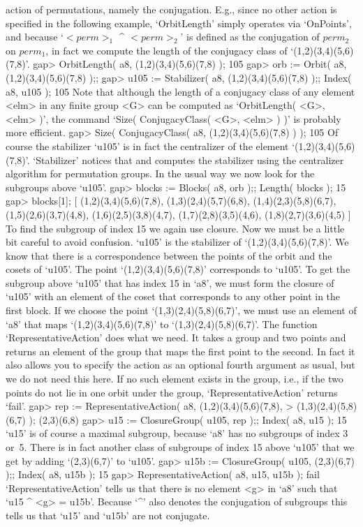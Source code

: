 action of permutations, namely the  conjugation.
E.g., since no  other action is specified  in the  following example,
`OrbitLength' simply operates via `OnPoints',
and because `$<perm>_1$ ^ $<perm>_2$' is defined as the conjugation
of $perm_2$ on $perm_1$, in fact we compute the length of
the conjugacy class of `(1,2)(3,4)(5,6)(7,8)'.
\beginexample
gap> OrbitLength( a8, (1,2)(3,4)(5,6)(7,8) );
105
gap> orb := Orbit( a8, (1,2)(3,4)(5,6)(7,8) );;
gap> u105 := Stabilizer( a8, (1,2)(3,4)(5,6)(7,8) );; Index( a8, u105 );
105
\endexample
Note that although the length of a conjugacy class of any element <elm>
in any finite group <G> can be computed as `OrbitLength( <G>, <elm> )',
the command `Size( ConjugacyClass( <G>, <elm> ) )' is probably more
efficient.
\beginexample
gap> Size( ConjugacyClass( a8, (1,2)(3,4)(5,6)(7,8) ) );
105
\endexample
Of course the stabilizer `u105' is in fact the centralizer of the element
`(1,2)(3,4)(5,6)(7,8)'.  `Stabilizer' notices    that and computes    the
stabilizer using the centralizer algorithm for permutation groups. In the
usual way we now look for the subgroups above `u105'.
\beginexample
gap> blocks := Blocks( a8, orb );; Length( blocks );
15
gap> blocks[1];
[ (1,2)(3,4)(5,6)(7,8), (1,3)(2,4)(5,7)(6,8), (1,4)(2,3)(5,8)(6,7), 
  (1,5)(2,6)(3,7)(4,8), (1,6)(2,5)(3,8)(4,7), (1,7)(2,8)(3,5)(4,6), 
  (1,8)(2,7)(3,6)(4,5) ]
\endexample
To find the subgroup of index 15 we  again use closure. Now  we must be a
little bit  careful to avoid    confusion. `u105' is the  stabilizer   of
`(1,2)(3,4)(5,6)(7,8)'. We  know  that there is  a correspondence between
the  points  of  the   orbit and  the   cosets  of  `u105'.   The   point
`(1,2)(3,4)(5,6)(7,8)' corresponds   to `u105'.
To get the subgroup above `u105' that has index 15 in `a8',
we must form the closure of `u105' with an element of the coset that
corresponds to any other point in the first block.
If we choose the point `(1,3)(2,4)(5,8)(6,7)',
we must use an element of `a8' that maps `(1,2)(3,4)(5,6)(7,8)' to
`(1,3)(2,4)(5,8)(6,7)'.
The function `RepresentativeAction' does what we need.
It takes a group and two points and returns an element of the group
that maps the first point to the second.
In fact it also allows you to specify the action as an optional fourth
argument as usual, but we do not need this here.
If no such element exists in the  group, i.e., if the two points do not
lie in one orbit under the group,
`RepresentativeAction' returns `fail'.
\beginexample
gap> rep := RepresentativeAction( a8, (1,2)(3,4)(5,6)(7,8),
>                                        (1,3)(2,4)(5,8)(6,7) );
(2,3)(6,8)
gap> u15 := ClosureGroup( u105, rep );; Index( a8, u15 );
15
\endexample
`u15' is of course a maximal  subgroup, because `a8'  has no subgroups of
index 3 or~5.  There is in fact  another  class of subgroups  of index 15
above `u105' that we get by adding `(2,3)(6,7)' to `u105'.
\beginexample
gap> u15b := ClosureGroup( u105, (2,3)(6,7) );; Index( a8, u15b );
15
gap> RepresentativeAction( a8, u15, u15b );
fail
\endexample
`RepresentativeAction' tells us that  there is no  element <g> in `a8'
such that `u15 ^ <g> = u15b'. Because `^' also denotes the conjugation of
subgroups this tells us  that  `u15' and  `u15b' are not  conjugate.

